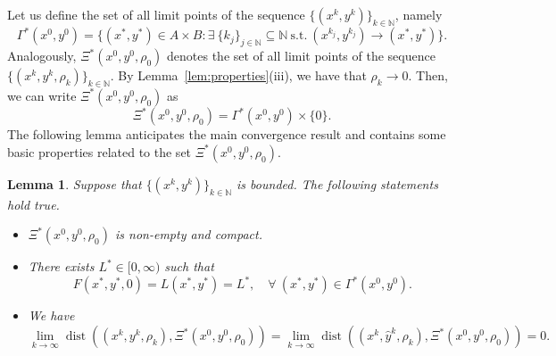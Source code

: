 \documentclass[pdflatex,sn-mathphys-num]{sn-jnl}
\numberwithin{equation}{section}%
\def\N{\mathbb{N}}
\theoremstyle{thmstyleone}%
\newtheorem{lemma}[theorem]{Lemma}%
\theoremstyle{thmstyletwo}%
\theoremstyle{thmstylethree}%
\begin{document}
Let us define the set of all limit points of the sequence $\{(x^k,y^k)\}_{k\in\N}$, namely
\begin{equation}\label{eq:Xstar}
    \Gamma^*(x^0,y^0) = \{(x^*,y^*)\in A\times B:\exists \ \{k_j\}_{j\in\N}\subseteq \mathbb{N} \ \text{s.t.} \  (x^{k_j},y^{k_j})\rightarrow (x^*,y^*)\}.
\end{equation}
Analogously, $\Xi^*(x^0,y^0,\rho_0)$ denotes the set of all limit points of the sequence $\{(x^k,y^k,\rho_k)\}_{k\in\N}$. By Lemma~\ref{lem:properties}(iii), we have that $\rho_k\rightarrow 0$. Then, we can write $\Xi^*(x^0,y^0,\rho_0)$ as
\begin{equation}\label{eq:Omegastar}
    \Xi^*(x^0,y^0,\rho_0) = \Gamma^*(x^0,y^0)\times \{0\}.
\end{equation}
The following lemma anticipates the main convergence result and contains some basic properties related to the set $\Xi^*(x^0,y^0,\rho_0)$.
\begin{lemma}\label{lem:preliminary}
    Suppose that $\{(x^k,y^k)\}_{k\in\N}$ is bounded. The following statements hold true.
    \begin{itemize}
        \item[(i)] $\Xi^*(x^0,y^0,\rho_0)$ is non-empty and compact.
        \item[(ii)] There exists $L^*\in[0,\infty)$ such that
        \begin{equation*}
            F(x^*,y^*,0) = L(x^*,y^*) = L^*,\quad \forall \ (x^*,y^*)\in \Gamma^*(x^0,y^0).
        \end{equation*}
        \item[(iii)] We have
        \begin{equation*}
            \lim_{k\rightarrow \infty} \operatorname{dist}((x^k,y^k,\rho_k),\Xi^*(x^0,y^0,\rho_0))=\lim_{k\rightarrow \infty}\operatorname{dist}((x^k,\hat{y}^k,\rho_k),\Xi^*(x^0,y^0,\rho_0))=0.
        \end{equation*}
    \end{itemize}
\end{lemma}
\end{document}
